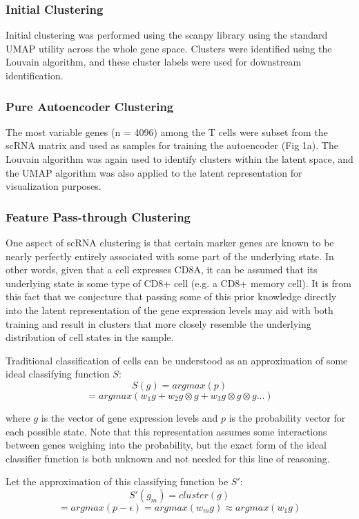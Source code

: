 \documentclass[journal]{IEEEtran}
\begin{document}
\subsubsection{Initial Clustering}
Initial clustering was performed using the scanpy library using the standard UMAP utility across the whole gene space. Clusters were identified using the Louvain algorithm, and these cluster labels were used for downstream identification.


\subsubsection{Pure Autoencoder Clustering}
The most variable genes (n = 4096) among the T cells were subset from the scRNA matrix and used as samples for training the autoencoder (Fig 1a). The Louvain algorithm was again used to identify clusters within the latent space, and the UMAP algorithm was also applied to the latent representation for visualization purposes.

\subsubsection{Feature Pass-through Clustering}
One aspect of scRNA clustering is that certain marker genes are known to be nearly perfectly entirely associated with some part of the underlying state. In other words, given that a cell expresses CD8A, it can be assumed that its underlying state is some type of CD8+ cell (e.g. a CD8+ memory cell). It is from this fact that we conjecture that passing some of this prior knowledge directly into the latent representation of the gene expression levels may aid with both training and result in clusters that more closely resemble the underlying distribution of cell states in the sample.

Traditional classification of cells can be understood as an approximation of some ideal classifying function $S$:
$$
S(g) = argmax(p) 
$$
$$
= argmax(w_1g + w_2 g\otimes g + w_3 g\otimes g\otimes g ... )
$$

where $g$ is the vector of gene expression levels and $p$ is the probability vector for each possible state. Note that this representation assumes some interactions between genes weighing into the probability, but the exact form of the ideal classifier function is both unknown and not needed for this line of reasoning.

Let the approximation of this classifying function be $S'$:
$$
S'(g_m) = cluster(g) 
$$
$$
= argmax(p - \epsilon) = argmax(w_mg) \approx argmax(w_1g)
$$
\end{document}
